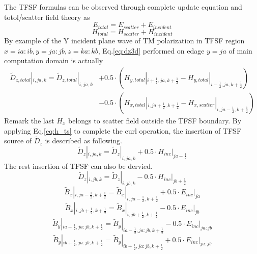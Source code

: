 The TFSF formulas can be observed through complete update equation and totol/scatter field theory as
\begin{displaymath}\label{eq:e_ts}
  E_{total}=E_{scatter}+E_{incident}
\end{displaymath}
\begin{displaymath}\label{eq:h_ts}
  H_{total}=H_{scatter}+H_{incident}  
\end{displaymath}
By example of the Y incident plane wave of TM polarization in TFSF region $x=ia:ib, y=ja:jb, z=ka:kb$, Eq.\ref{eq:dz3d}
performed on edage $y=ja$ of main computation domain is actually 
\begin{equation}
  \begin{split}
    \widetilde{D}_{z,total}|_{i,ja,k} = \widetilde{D}_{z,total}|_{i,ja,k} &+ 0.5 \cdot \left( H_{y,total}|_{i+\frac{1}{2},ja,k+\frac{1}{2}} - H_{y,total}|_{i-\frac{1}{2},ja,k+\frac{1}{2}} \right) \\
    &- 0.5 \cdot \left( H_{x,total}|_{i,ja+\frac{1}{2},k+\frac{1}{2}} - H_{x,scatter}|_{i,ja-\frac{1}{2},k+\frac{1}{2}} \right)    
  \end{split}
\end{equation}
Remark the last $H_x$ belongs to scatter field outside the TFSF boundary. By applying Eq.\ref{eq:h_ts} to complete the
curl operation, the insertion of TFSF source of $\widetilde{D}_z$ is described as following.
\begin{displaymath}
  \widetilde{D}_z|_{i,ja,k} = \widetilde{D}_z|_{i,ja,k} + 0.5 \cdot H_{inc}|_{ja-\frac{1}{2}}
\end{displaymath}
The rest insertion of TFSF can also be dervied.
\begin{displaymath}
  \widetilde{D}_z|_{i,jb,k} = \widetilde{D}_z|_{i,jb,k} - 0.5 \cdot H_{inc}|_{jb+\frac{1}{2}}  
\end{displaymath}
\begin{displaymath}
  \widetilde{B}_x|_{i,ja-\frac{1}{2},k+\frac{1}{2}}=\widetilde{B}_x|_{i,ja-\frac{1}{2},k+\frac{1}{2}}+0.5 \cdot E_{inc}|_{ja}
\end{displaymath}
\begin{displaymath}
  \widetilde{B}_x|_{i,jb+\frac{1}{2},k+\frac{1}{2}}=\widetilde{B}_x|_{i,jb+\frac{1}{2},k+\frac{1}{2}}-0.5 \cdot E_{inc}|_{jb}
\end{displaymath}
\begin{displaymath}
  \widetilde{B}_y|_{ia-\frac{1}{2},ja:jb,k+\frac{1}{2}}=\widetilde{B}_y|_{ia-\frac{1}{2},ja:jb,k+\frac{1}{2}}-0.5 \cdot E_{inc}|_{ja:jb}
\end{displaymath}
\begin{displaymath}
  \widetilde{B}_y|_{ib+\frac{1}{2},ja:jb,k+\frac{1}{2}}=\widetilde{B}_y|_{ib+\frac{1}{2},ja:jb,k+\frac{1}{2}}+0.5 \cdot E_{inc}|_{ja:jb}
\end{displaymath}






